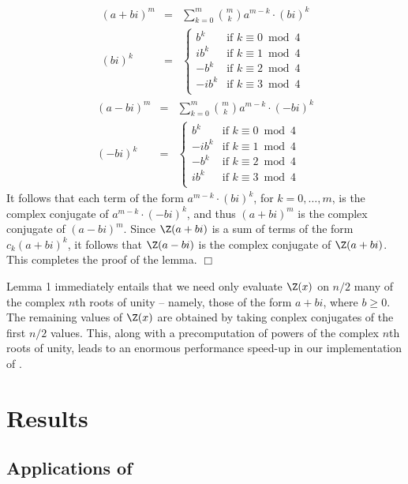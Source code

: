\begin{eqnarray*}
(a+bi)^m &=& \sum_{k=0}^m {m \choose k} a^{m-k}\cdot  (bi)^k \\
(bi)^k  &=& \left\{
\begin{array}{ll}
b^k &\mbox{if $k \equiv 0 \bmod 4$}\\
i b^k &\mbox{if $k \equiv 1 \bmod 4$}\\
-b^k &\mbox{if $k \equiv 2 \bmod 4$}\\
-i b^k &\mbox{if $k \equiv 3 \bmod 4$}\\
\end{array} \right.
\end{eqnarray*}
\begin{eqnarray*}
(a-bi)^m &=& \sum_{k=0}^m {m \choose k} a^{m-k} \cdot (-bi)^k \\
(-bi)^k &=& \left\{
\begin{array}{ll}
b^k &\mbox{if $k \equiv 0 \bmod 4$}\\
-ib^k &\mbox{if $k \equiv 1 \bmod 4$}\\
-b^k &\mbox{if $k \equiv 2 \bmod 4$}\\
ib^k &\mbox{if $k \equiv 3 \bmod 4$}\\
\end{array} \right.
\end{eqnarray*}
It follows that each term of the form
$a^{m-k} \cdot (bi)^k$, for $k=0,\ldots,m$, is the complex conjugate of
$a^{m-k} \cdot (-bi)^k$, and thus $(a+bi)^m$ is the complex conjugate of
$(a-bi)^m$. Since $\Z(a+bi)$ is a sum of terms of the form $c_k (a+bi)^k$,
it follows that $\Z(a-bi)$ is the complex conjugate of $\Z(a+bi)$.
This completes the proof of the lemma. \hfill  $\Box$
\medskip

Lemma 1 immediately entails that we need only evaluate $\Z(x)$ on $n/2$
many of the complex $n$th roots of unity -- namely, those of the form
$a+bi$, where $b \geq 0$. The remaining values of $\Z(x)$ are obtained by
taking conplex conjugates of the first $n/2$ values. This, along with a
precomputation of powers of the complex $n$th roots of unity, leads to an
enormous performance speed-up in our implementation of \fftbor.

\section*{Results}
\subsection*{Applications of \fftbor}
\label{section:applications}

